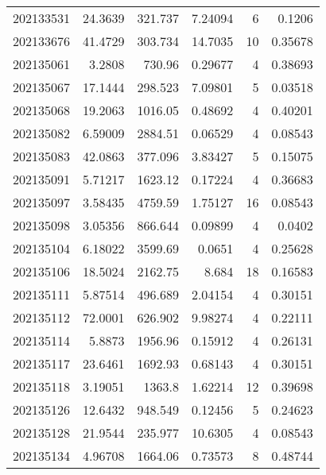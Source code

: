 \begin{tabular}{rrrrrr}
 202133531 &         24.3639  &      321.737  &            7.24094 &           6 & 0.1206  \\
 202133676 &         41.4729  &      303.734  &           14.7035  &          10 & 0.35678 \\
 202135061 &          3.2808  &      730.96   &            0.29677 &           4 & 0.38693 \\
 202135067 &         17.1444  &      298.523  &            7.09801 &           5 & 0.03518 \\
 202135068 &         19.2063  &     1016.05   &            0.48692 &           4 & 0.40201 \\
 202135082 &          6.59009 &     2884.51   &            0.06529 &           4 & 0.08543 \\
 202135083 &         42.0863  &      377.096  &            3.83427 &           5 & 0.15075 \\
 202135091 &          5.71217 &     1623.12   &            0.17224 &           4 & 0.36683 \\
 202135097 &          3.58435 &     4759.59   &            1.75127 &          16 & 0.08543 \\
 202135098 &          3.05356 &      866.644  &            0.09899 &           4 & 0.0402  \\
 202135104 &          6.18022 &     3599.69   &            0.0651  &           4 & 0.25628 \\
 202135106 &         18.5024  &     2162.75   &            8.684   &          18 & 0.16583 \\
 202135111 &          5.87514 &      496.689  &            2.04154 &           4 & 0.30151 \\
 202135112 &         72.0001  &      626.902  &            9.98274 &           4 & 0.22111 \\
 202135114 &          5.8873  &     1956.96   &            0.15912 &           4 & 0.26131 \\
 202135117 &         23.6461  &     1692.93   &            0.68143 &           4 & 0.30151 \\
 202135118 &          3.19051 &     1363.8    &            1.62214 &          12 & 0.39698 \\
 202135126 &         12.6432  &      948.549  &            0.12456 &           5 & 0.24623 \\
 202135128 &         21.9544  &      235.977  &           10.6305  &           4 & 0.08543 \\
 202135134 &          4.96708 &     1664.06   &            0.73573 &           8 & 0.48744 \\

\end{tabular}

